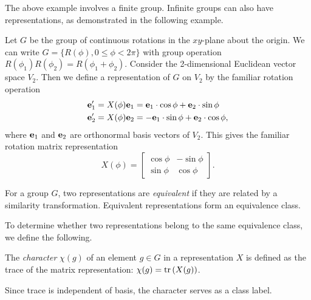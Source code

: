 The above example involves a finite group. Infinite groups can also have representations, as demonstrated in the following example.
\begin{example}
    Let $G$ be the group of continuous rotations in the $xy$-plane about the origin. We can write $G = \{R(\phi),0\leq\phi<2\pi\}$ with group operation $R(\phi_1)R(\phi_2) = R(\phi_1+\phi_2)$. Consider the 2-dimensional Euclidean vector space $V_2$. Then we define a representation of $G$ on $V_2$ by the familiar rotation operation
    \begin{align}
        \mathbf{e}_1' &= X(\phi)\mathbf{e}_1 = \mathbf{e}_1\cdot\cos\phi + \mathbf{e}_2\cdot\sin\phi\\
        \mathbf{e}_2' &= X(\phi)\mathbf{e}_2 = -\mathbf{e}_1\cdot\sin\phi + \mathbf{e}_2\cdot\cos\phi,
    \end{align}
    where $\mathbf{e}_1$ and $\mathbf{e}_2$ are orthonormal basis vectors of $V_2$. This gives the familiar rotation matrix representation
    \begin{equation}
        X(\phi) = \begin{bmatrix}
            \cos\phi & -\sin\phi\\
            \sin\phi & \cos\phi
        \end{bmatrix}.
    \end{equation}
\end{example}

\begin{definition}
    For a group $G$, two representations are \textit{equivalent} if they are related by a similarity transformation. Equivalent representations form an equivalence class.
\end{definition}

To determine whether two representations belong to the same equivalence class, we define the following.
\begin{definition}
    The \textit{character} $\chi(g)$ of an element $g\in G$ in a representation $X$ is defined as the trace of the matrix representation: $\chi(g) = \textrm{tr}\left(X(g)\right)$.
\end{definition}
Since trace is independent of basis, the character serves as a class label.

